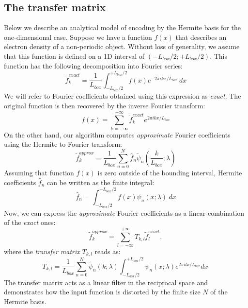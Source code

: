 \subsection{The transfer matrix}
Below we describe an analytical model of encoding by the Hermite basis for the one-dimensional case.
Suppose we have a function  $f(x)$ that describes an electron density of a non-periodic object. 
Without loss of generality, we assume that this function is defined on a 1D interval of $(-L_{box}/2;+L_{box}/2)$.
This function has the following decomposition into Fourier series:
\begin{equation}
\tilde{f}^{exact}_{k} = \frac{1}{L_{box}}\int_{-L_{box}/2}^{+L_{box}/2} f(x)e^{-2\pi i k x/L_{box}}~dx
\end{equation}
We will refer to Fourier coefficients obtained using this expression as {\em exact}. 
%
The original function is then recovered by the inverse Fourier transform:
\begin{equation}
f(x) = \sum_{k=-\infty}^{+\infty} \tilde{f}^{exact}_{k}e^{2\pi i k x/L_{box}}
\end{equation}
%
On the other hand, our algorithm computes {\em approximate} Fourier coefficients using the Hermite to Fourier transform:
\begin{equation}
 \tilde{f}^{approx}_k=\frac{1}{L_{box}}\sum_{n=0}^{N}\hat{f}_{n}\tilde{\psi}_{n}(\frac{k}{L_{box}}; \lambda)
 \end{equation}
Assuming that function $f(x)$ is zero outside of the bounding interval, Hermite coefficients $\hat{f}_{n}$ can be written as the finite integral:
\begin{equation}
\hat{f}_{n} = \int_{-L_{box}/2}^{+L_{box}/2} f(x) \psi_{n}(x; \lambda)~dx
\end{equation}
%
Now, we can express the {\em approximate} Fourier coefficients as a linear combination of the {\em exact} ones:
\begin{equation}
\tilde{f}^{approx}_{k} = \sum_{l=-\infty}^{+\infty} T_{k,l} \tilde{f}^{exact}_{l}, 
\label{Eq:fourierApproximation}
\end{equation}
where the  {\em transfer matrix} $T_{k,l}$ reads as:
\begin{equation}
T_{k,l} = \frac{1}{L_{box}}\sum_{n=0}^{N}  \tilde{\psi}_{n}(k; \lambda) \int_{-L_{box}/2}^{+L_{box}/2} \psi_{n}(x; \lambda) e^{2\pi i l x/L_{box}} dx~
\label{eq:Tmatrix}
\end{equation}
%
The transfer matrix acts as a linear filter in the reciprocal space and demonstrates how the input function is distorted by the finite size $N$ of the Hermite basis. 
